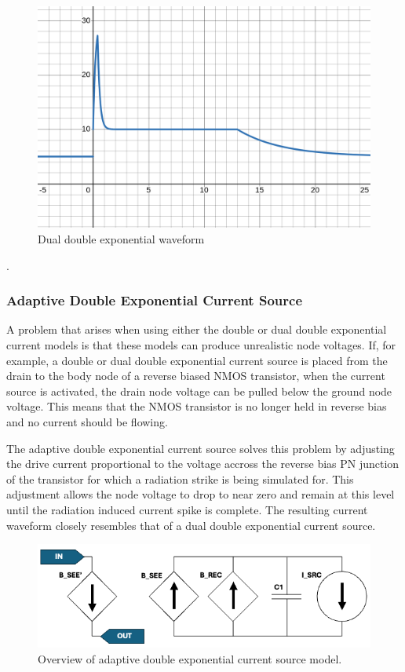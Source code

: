 \documentclass[conference]{IEEEtran}
\begin{document}
\begin{figure}[htbp]
\centering
\includegraphics[width=0.9\linewidth]{dual_double_exponential.png}
\caption{Dual double exponential waveform}
\label{fig:dual_double_exp}
\end{figure}

\cite{Pepper1990}.

\subsubsection{Adaptive Double Exponential Current Source}
A problem that arises when using either the double or dual double exponential current models is that these models can produce unrealistic node voltages. If, for example, a double or dual double exponential current source is placed from the drain to the body node of a reverse biased NMOS transistor, when the current source is activated, the drain node voltage can be pulled below the ground node voltage. This means that the NMOS transistor is no longer held in reverse bias and no current should be flowing.

The adaptive double exponential current source solves this problem by adjusting the drive current proportional to the voltage accross the reverse bias PN junction of the transistor for which a radiation strike is being simulated for. This adjustment allows the node voltage to drop to near zero and remain at this level until the radiation induced current spike is complete. The resulting current waveform closely resembles that of a dual double exponential current source.

\begin{figure}[htbp]
\centering
\includegraphics[width=1\linewidth]{Adaptive_Model_Cropped.png}
\caption{Overview of adaptive double exponential current source model.}
\label{fig:adaptive_model_overview}
\end{figure}
\end{document}
